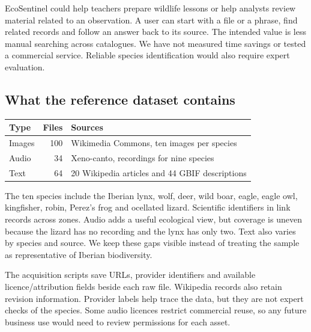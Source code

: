 \documentclass[10pt,a4paper]{article}
\begin{document}
EcoSentinel could help teachers prepare wildlife lessons or help analysts review material related to an observation. A user can start with a file or a phrase, find related records and follow an answer back to its source. The intended value is less manual searching across catalogues. We have not measured time savings or tested a commercial service. Reliable species identification would also require expert evaluation.

\subsection*{What the reference dataset contains}
\begin{tabularx}{\linewidth}{@{}l r Y@{}}\toprule
Type & Files & Sources\\\midrule
Images & 100 & Wikimedia Commons, ten images per species\\
Audio & 34 & Xeno-canto, recordings for nine species\\
Text & 64 & 20 Wikipedia articles and 44 GBIF descriptions\\\bottomrule
\end{tabularx}

The ten species include the Iberian lynx, wolf, deer, wild boar, eagle, eagle owl, kingfisher, robin, Perez's frog and ocellated lizard. Scientific identifiers in  link records across zones. Audio adds a useful ecological view, but coverage is uneven because the lizard has no recording and the lynx has only two. Text also varies by species and source. We keep these gaps visible instead of treating the sample as representative of Iberian biodiversity.

The acquisition scripts save URLs, provider identifiers and available licence/attribution fields beside each raw file. Wikipedia records also retain revision information. Provider labels help trace the data, but they are not expert checks of the species. Some audio licences restrict commercial reuse, so any future business use would need to review permissions for each asset.
\end{document}
